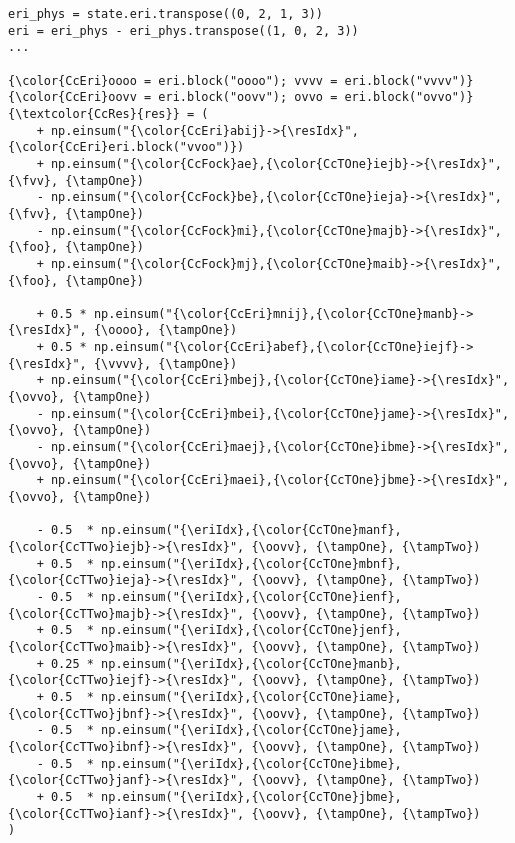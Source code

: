 \begin{minipage}{0.48\textwidth}
\newcommand{\vvoo}{\textcolor{CcEri}{vvoo}}
\newcommand{\oovv}{\textcolor{CcEri}{oovv}}
\newcommand{\ovvo}{\textcolor{CcEri}{ovvo}}
\newcommand{\oooo}{\textcolor{CcEri}{oooo}}
\newcommand{\vvvv}{\textcolor{CcEri}{vvvv}}
\newcommand{\fvv}{\textcolor{CcFock}{state.fock.block("vv")}}
\newcommand{\foo}{\textcolor{CcFock}{state.fock.block("oo")}}
\newcommand{\eriIdx}{\textcolor{CcEri}{mnef}}
\newcommand{\tampOne}{\textcolor{CcTOne}{t2}}
\newcommand{\tampTwo}{\textcolor{CcTTwo}{t2}}
\newcommand{\resIdx}{\textcolor{CcRes}{iajb}}
\begin{BVerbatim}[commandchars=\\\{\},fontsize={\smaller}]
eri_phys = state.eri.transpose((0, 2, 1, 3))
eri = eri_phys - eri_phys.transpose((1, 0, 2, 3))
...

{\color{CcEri}oooo = eri.block("oooo"); vvvv = eri.block("vvvv")}
{\color{CcEri}oovv = eri.block("oovv"); ovvo = eri.block("ovvo")}
{\textcolor{CcRes}{res}} = (
    + np.einsum("{\color{CcEri}abij}->{\resIdx}", {\color{CcEri}eri.block("vvoo")})
    + np.einsum("{\color{CcFock}ae},{\color{CcTOne}iejb}->{\resIdx}", {\fvv}, {\tampOne})
    - np.einsum("{\color{CcFock}be},{\color{CcTOne}ieja}->{\resIdx}", {\fvv}, {\tampOne})
    - np.einsum("{\color{CcFock}mi},{\color{CcTOne}majb}->{\resIdx}", {\foo}, {\tampOne})
    + np.einsum("{\color{CcFock}mj},{\color{CcTOne}maib}->{\resIdx}", {\foo}, {\tampOne})

    + 0.5 * np.einsum("{\color{CcEri}mnij},{\color{CcTOne}manb}->{\resIdx}", {\oooo}, {\tampOne})
    + 0.5 * np.einsum("{\color{CcEri}abef},{\color{CcTOne}iejf}->{\resIdx}", {\vvvv}, {\tampOne})
    + np.einsum("{\color{CcEri}mbej},{\color{CcTOne}iame}->{\resIdx}", {\ovvo}, {\tampOne})
    - np.einsum("{\color{CcEri}mbei},{\color{CcTOne}jame}->{\resIdx}", {\ovvo}, {\tampOne})
    - np.einsum("{\color{CcEri}maej},{\color{CcTOne}ibme}->{\resIdx}", {\ovvo}, {\tampOne})
    + np.einsum("{\color{CcEri}maei},{\color{CcTOne}jbme}->{\resIdx}", {\ovvo}, {\tampOne})

    - 0.5  * np.einsum("{\eriIdx},{\color{CcTOne}manf},{\color{CcTTwo}iejb}->{\resIdx}", {\oovv}, {\tampOne}, {\tampTwo})
    + 0.5  * np.einsum("{\eriIdx},{\color{CcTOne}mbnf},{\color{CcTTwo}ieja}->{\resIdx}", {\oovv}, {\tampOne}, {\tampTwo})
    - 0.5  * np.einsum("{\eriIdx},{\color{CcTOne}ienf},{\color{CcTTwo}majb}->{\resIdx}", {\oovv}, {\tampOne}, {\tampTwo})
    + 0.5  * np.einsum("{\eriIdx},{\color{CcTOne}jenf},{\color{CcTTwo}maib}->{\resIdx}", {\oovv}, {\tampOne}, {\tampTwo})
    + 0.25 * np.einsum("{\eriIdx},{\color{CcTOne}manb},{\color{CcTTwo}iejf}->{\resIdx}", {\oovv}, {\tampOne}, {\tampTwo})
    + 0.5  * np.einsum("{\eriIdx},{\color{CcTOne}iame},{\color{CcTTwo}jbnf}->{\resIdx}", {\oovv}, {\tampOne}, {\tampTwo})
    - 0.5  * np.einsum("{\eriIdx},{\color{CcTOne}jame},{\color{CcTTwo}ibnf}->{\resIdx}", {\oovv}, {\tampOne}, {\tampTwo})
    - 0.5  * np.einsum("{\eriIdx},{\color{CcTOne}ibme},{\color{CcTTwo}janf}->{\resIdx}", {\oovv}, {\tampOne}, {\tampTwo})
    + 0.5  * np.einsum("{\eriIdx},{\color{CcTOne}jbme},{\color{CcTTwo}ianf}->{\resIdx}", {\oovv}, {\tampOne}, {\tampTwo})
)
\end{BVerbatim}
\end{minipage}
